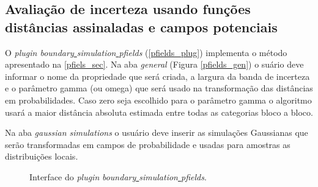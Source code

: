 \subsection{Avaliação de incerteza usando funções distâncias assinaladas e campos potenciais}

O \textit{plugin boundary\underline{ }simulation\underline{ }pfields} (\autoref{pfields_plug}) implementa o método apresentado na \autoref{pfiels_sec}. Na aba \textit{general} (Figura \autoref{pfields_gen}) o suário deve informar o nome da propriedade que será criada, a largura da banda de incerteza e o parâmetro gamma (ou omega) que será usado na transformação das distâncias em probabilidades. Caso zero seja escolhido para o parâmetro gamma o algoritmo usará a maior distância absoluta estimada entre todas as categorias bloco a bloco.

Na aba \textit{gaussian simulations} o usuário deve inserir as simulações Gaussianas que serão transformadas em campos de probabilidade e usadas para amostras as distribuições locais.

\begin{figure}[H] 
    \centering
    \caption{Interface do \textit{plugin} \textit{boundary\underline{ }simulation\underline{ }pfields}.} \label{pfields_plug}
     \hspace{1em}
\end{figure}


